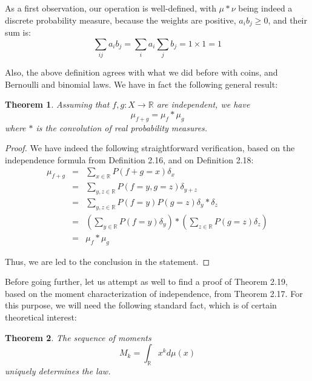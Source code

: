 \documentclass[12pt]{amsbook}
\newtheorem{theorem}{Theorem}[chapter]
\begin{document}
As a first observation, our operation is well-defined, with $\mu*\nu$ being indeed a discrete probability measure, because the weights are positive, $a_ib_j\geq0$, and their sum is:
$$\sum_{ij}a_ib_j=\sum_ia_i\sum_jb_j=1\times 1=1$$

Also, the above definition agrees with what we did before with coins, and Bernoulli and binomial laws. We have in fact the following general result:


\begin{theorem}
Assuming that $f,g:X\to\mathbb R$ are independent, we have
$$\mu_{f+g}=\mu_f*\mu_g$$
where $*$ is the convolution of real probability measures.
\end{theorem}

\begin{proof}
We have indeed the following straightforward verification, based on the independence formula from Definition 2.16, and on Definition 2.18:
\begin{eqnarray*}
\mu_{f+g}
&=&\sum_{x\in\mathbb R}P(f+g=x)\delta_x\\
&=&\sum_{y,z\in\mathbb R}P(f=y,g=z)\delta_{y+z}\\
&=&\sum_{y,z\in\mathbb R}P(f=y)P(g=z)\delta_y*\delta_z\\
&=&\left(\sum_{y\in\mathbb R}P(f=y)\delta_y\right)*\left(\sum_{z\in\mathbb R}P(g=z)\delta_z\right)\\
&=&\mu_f*\mu_g
\end{eqnarray*}

Thus, we are led to the conclusion in the statement.
\end{proof}

Before going further, let us attempt as well to find a proof of Theorem 2.19, based on the moment characterization of independence, from Theorem 2.17. For this purpose, we will need the following standard fact, which is of certain theoretical interest:

\begin{theorem}
The sequence of moments 
$$M_k=\int_\mathbb Rx^kd\mu(x)$$
uniquely determines the law.
\end{theorem}
\end{document}
